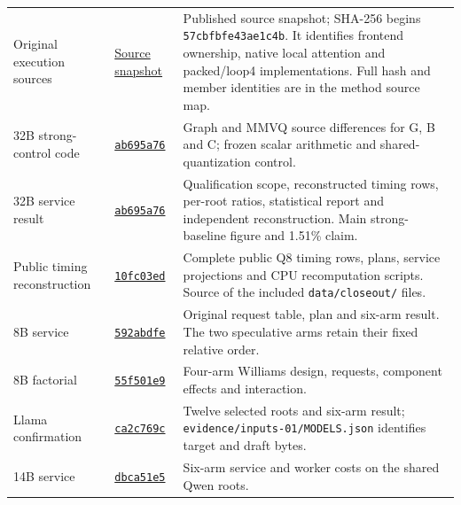 \begin{longtable}{@{}p{3.2cm}p{2.35cm}p{10.0cm}@{}}
Original execution sources & \href{https://github.com/leecdiang/HeteroSpec/releases/download/tpds-phase1-rtx-review-v2-evidence-20261107/rtx-phase1-source.zip}{Source snapshot} & Published source snapshot; SHA-256 begins \texttt{57cbfbfe43ae1c4b}. It identifies frontend ownership, native local attention and packed/loop4 implementations. Full hash and member identities are in the method source map.\\
32B strong-control code & \href{https://github.com/leecdiang/HeteroSpec/tree/ab695a766d055f7d3c6b1fed0720c579c749bcdb/benchmarks/server_expansion_v1/strong_baseline_followup_20261110/F0_DATA}{\texttt{ab695a76}} & Graph and MMVQ source differences for G, B and C; frozen scalar arithmetic and shared-quantization control.\\
32B service result & \href{https://github.com/leecdiang/HeteroSpec/tree/ab695a766d055f7d3c6b1fed0720c579c749bcdb/benchmarks/server_expansion_v1/strong_baseline_followup_20261110/RESULTS_S3_20261112}{\texttt{ab695a76}} & Qualification scope, reconstructed timing rows, per-root ratios, statistical report and independent reconstruction. Main strong-baseline figure and 1.51\% claim.\\
Public timing reconstruction & \href{https://github.com/leecdiang/HeteroSpec/tree/10fc03ed59e260a290a8ca8d6670d30d50f08118/benchmarks/jpdc_closeout_20261113}{\texttt{10fc03ed}} & Complete public Q8 timing rows, plans, service projections and CPU recomputation scripts. Source of the included \texttt{data/closeout/} files.\\
8B service & \href{https://github.com/leecdiang/HeteroSpec/tree/592abdfe9267fd97ecbde18cd0ee9a1bfc319e20/benchmarks/linux_transfer_v1/results_ampere_20261107}{\texttt{592abdfe}} & Original request table, plan and six-arm result. The two speculative arms retain their fixed relative order.\\
8B factorial & \href{https://github.com/leecdiang/HeteroSpec/tree/55f501e9a93013a4b4d82cc4967e82b8d9054a81/benchmarks/server_expansion_v1/M/results_ampere_m1_20261107}{\texttt{55f501e9}} & Four-arm Williams design, requests, component effects and interaction.\\
Llama confirmation & \href{https://github.com/leecdiang/HeteroSpec/tree/ca2c769c87d9b072eb050373e571abfd616ec1fa/benchmarks/server_expansion_v1/F/results_confirmation_20261108}{\texttt{ca2c769c}} & Twelve selected roots and six-arm result; \texttt{evidence/inputs-01/MODELS.json} identifies target and draft bytes.\\
14B service & \href{https://github.com/leecdiang/HeteroSpec/tree/dbca51e565ca90242ef7a39c5a6df98c1db2ba76/benchmarks/server_expansion_v1/D14/results_complete_20261108}{\texttt{dbca51e5}} & Six-arm service and worker costs on the shared Qwen roots.\\

\end{longtable}
